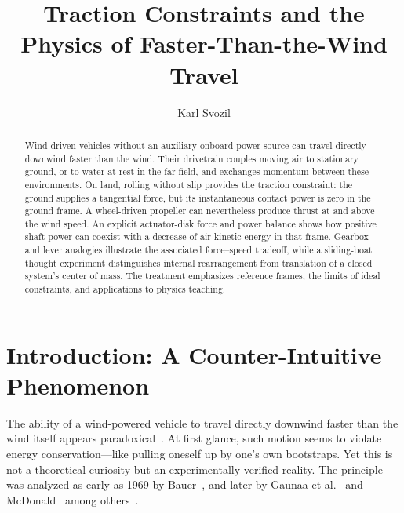 \documentclass[reprint,aps,pra,longbibliography]{revtex4-2}
\begin{document}
\title{Traction Constraints and the Physics of Faster-Than-the-Wind Travel}

\author{Karl Svozil }

\begin{abstract}

Wind-driven vehicles without an auxiliary onboard power source can travel directly downwind faster than the wind. Their drivetrain couples moving air to stationary ground, or to water at rest in the far field, and exchanges momentum between these environments. On land, rolling without slip provides the traction constraint: the ground supplies a tangential force, but its instantaneous contact power is zero in the ground frame. A wheel-driven propeller can nevertheless produce thrust at and above the wind speed. An explicit actuator-disk force and power balance shows how positive shaft power can coexist with a decrease of air kinetic energy in that frame. Gearbox and lever analogies illustrate the associated force--speed tradeoff, while a sliding-boat thought experiment distinguishes internal rearrangement from translation of a closed system's center of mass. The treatment emphasizes reference frames, the limits of ideal constraints, and applications to physics teaching.

\end{abstract}

\maketitle

\section{Introduction: A Counter-Intuitive Phenomenon}

The ability of a wind-powered vehicle to travel directly downwind faster than the wind itself appears paradoxical~\cite{Blackford1978,Stong1975,McDonald2021}. At first glance, such motion seems to violate energy conservation---like pulling oneself up by one's own bootstraps. Yet this is not a theoretical curiosity but an experimentally verified reality. The principle was analyzed as early as 1969 by Bauer~\cite{Bauer1969,bauer1971sailing,bauer1974taking}, and later by Gaunaa et al.~\cite{Gaunaa2009} and McDonald~\cite{McDonald2021} among others~\cite{khan2013analysis,AAPT2013}.
\end{document}
